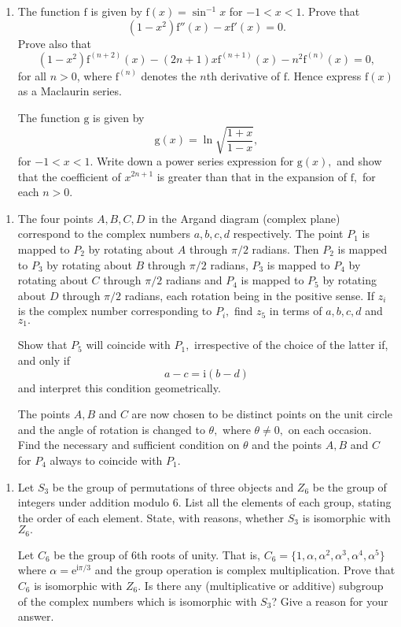 \documentclass[a4, 11pt]{report}
\newlength{\qspace}
\newcounter{qnumber}
\newenvironment{question}%
 {\vspace{\qspace}
  \begin{enumerate}[\bfseries 1\quad][10]%
    \setcounter{enumi}{\value{qnumber}}%
    \item%
 }
{
  \end{enumerate}
  \filbreak
  \stepcounter{qnumber}
 }
\begin{document}
\begin{question}
The function $\mathrm{f}$ is given by $\mathrm{f}(x)=\sin^{-1}x$
for $-1<x<1.$ Prove that 
\[
(1-x^{2})\mathrm{f}''(x)-x\mathrm{f}'(x)=0.
\]
Prove also that 
\[
(1-x^{2})\mathrm{f}^{(n+2)}(x)-(2n+1)x\mathrm{f}^{(n+1)}(x)-n^{2}\mathrm{f}^{(n)}(x)=0,
\]
for all $n>0$, where $\mathrm{f}^{(n)}$ denotes the $n$th derivative
of $\mathrm{f}$. Hence express $\mathrm{f}(x)$ as a Maclaurin series. 


The function $\mathrm{g}$ is given by 
\[
\mathrm{g}(x)=\ln\sqrt{\frac{1+x}{1-x}},
\]
for $-1<x<1.$ Write down a power series expression for $\mathrm{g}(x),$
and show that the coefficient of $x^{2n+1}$ is greater than that
in the expansion of $\mathrm{f},$ for each $n>0$. 
	\end{question}
	
\begin{question}
The four points $A,B,C,D$ in the Argand diagram (complex plane) correspond
to the complex numbers $a,b,c,d$ respectively. The point $P_{1}$
is mapped to $P_{2}$ by rotating about $A$ through $\pi/2$ radians.
Then $P_{2}$ is mapped to $P_{3}$ by rotating about $B$ through
$\pi/2$ radians, $P_{3}$ is mapped to $P_{4}$ by rotating about
$C$ through $\pi/2$ radians and $P_{4}$ is mapped to $P_{5}$ by
rotating about $D$ through $\pi/2$ radians, each rotation being
in the positive sense. If $z_{i}$ is the complex number corresponding
to $P_{i},$ find $z_{5}$ in terms of $a,b,c,d$ and $z_{1}.$ 


Show that $P_{5}$ will coincide with $P_{1},$ irrespective of the
choice of the latter if, and only if \[a-c=\mathrm{i}(b-d)\] and interpret
this condition geometrically. 


The points $A,B$ and $C$ are now chosen to be distinct points on
the unit circle and the angle of rotation is changed to $\theta,$
where $\theta\neq0,$ on each occasion. Find the necessary and sufficient
condition on $\theta$ and the points $A,B$ and $C$ for $P_{4}$
always to coincide with $P_{1}.$ 
\end{question}
	
\begin{question}
Let $S_{3}$ be the group of permutations of three objects and $Z_{6}$
be the group of integers under addition modulo 6. List all the elements
of each group, stating the order of each element. State, with reasons,
whether $S_{3}$ is isomorphic with $Z_{6}.$


Let $C_{6}$ be the group of 6th roots of unity. That is, $C_{6}=\{1,\alpha,\alpha^{2},\alpha^{3},\alpha^{4},\alpha^{5}\}$
where $\alpha=\mathrm{e}^{\mathrm{i}\pi/3}$ and the group operation
is complex multiplication. Prove that $C_{6}$ is isomorphic with
$Z_{6}.$ Is there any (multiplicative or additive) subgroup of the
complex numbers which is isomorphic with $S_{3}$? Give a reason for
your answer. 
\end{question}
		
\end{document}
